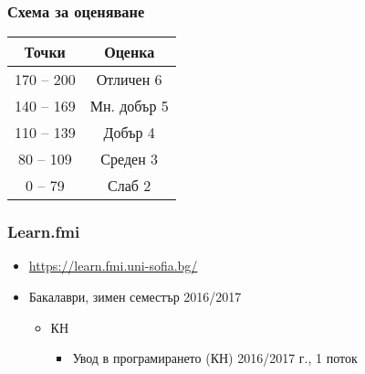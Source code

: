 \documentclass{beamer}
\begin{document}
\begin{frame}
  \frametitle{Схема за оценяване}

  \begin{center}
    \begin{tabular}{|c|c|}
      \hline
      \textbf{Точки} & \textbf{Оценка}\\
      \hline\hline
      170 -- 200&Отличен 6\\
      \hline
      140 -- 169&Мн. добър 5\\
      \hline
      110 -- 139&Добър 4\\
      \hline
      80  -- 109&Среден 3\\
      \hline
      0   --  79&Слаб 2\\
      \hline
    \end{tabular}
  \end{center}
\end{frame}

\begin{frame}
  \frametitle{Learn.fmi}
  
  \begin{itemize}
  \item \url{https://learn.fmi.uni-sofia.bg/}
  \item Бакалаври, зимен семестър 2016/2017
    \begin{itemize}
    \item КН
      \begin{itemize}
      \item Увод в програмирането (КН) 2016/2017 г., 1 поток
      \end{itemize}
    \end{itemize}
  \end{itemize}
\end{frame}
\end{document}
